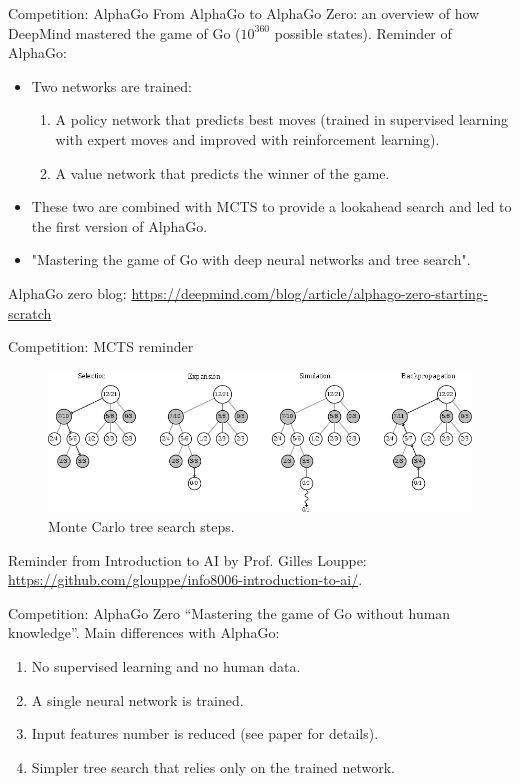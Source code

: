 \documentclass[9pt, hyperref={pdfusetitle,colorlinks=true,allcolors=DarkBlue}]{beamer}
\begin{document}
\begin{frame}{Competition: AlphaGo}
From AlphaGo to AlphaGo Zero: an overview of how DeepMind mastered the game of Go ($10^{360}$ possible states).
\vfill
Reminder of AlphaGo:
\begin{itemize}
    \item Two networks are trained:
    \begin{enumerate}
        \item A policy network that predicts best moves (trained in supervised learning with expert moves and improved with reinforcement learning).
        \item A value network that predicts the winner of the game.
    \end{enumerate}
    \vfill
    \item These two are combined with MCTS to provide a lookahead search and led to the first version of AlphaGo.
    \vfill
    \item "Mastering the game of Go with deep neural networks and tree search".
\end{itemize}
 \vfill
AlphaGo zero blog: \url{https://deepmind.com/blog/article/alphago-zero-starting-scratch}
\end{frame}

\begin{frame}{Competition: MCTS reminder}

\begin{figure}
    \centering
    \includegraphics[width=\textwidth]{mcts.png}
    \caption{Monte Carlo tree search steps.}
    \label{fig:mcts}
\end{figure}

Reminder from Introduction to AI by Prof. Gilles Louppe: \url{https://github.com/glouppe/info8006-introduction-to-ai/}.

\end{frame}

\begin{frame}{Competition: AlphaGo Zero}
``Mastering the game of Go without human knowledge''.
\vfill
Main differences with AlphaGo:
\vfill
\begin{enumerate}
    \item No supervised learning and no human data.
    \vfill
    \item A single neural network is trained.
    \vfill
    \item Input features number is reduced (see paper for details).
    \vfill
    \item Simpler tree search that relies only on the trained network.
    \vfill
\end{enumerate}

\end{frame}
\end{document}
